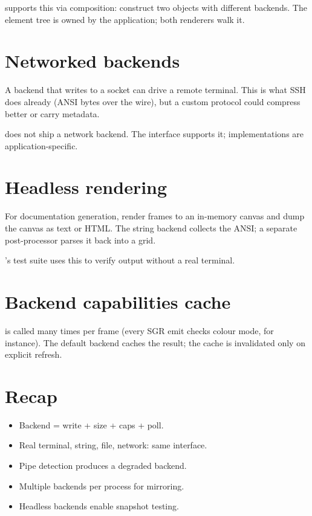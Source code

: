 \maya{} supports this via composition: construct two
 objects with different backends. The element
tree is owned by the application; both renderers walk it.

\section{Networked backends}

A backend that writes to a socket can drive a remote
terminal. This is what SSH does already (ANSI bytes over the
wire), but a custom protocol could compress better or carry
metadata.

\maya{} does not ship a network backend. The interface
supports it; implementations are application-specific.

\section{Headless rendering}

For documentation generation, render frames to an in-memory
canvas and dump the canvas as text or HTML. The string
backend collects the ANSI; a separate post-processor parses
it back into a grid.

\maya{}'s test suite uses this to verify output without a
real terminal.

\section{Backend capabilities cache}

 is called many times per frame (every SGR
emit checks colour mode, for instance). The default backend
caches the result; the cache is invalidated only on
explicit refresh.

\section{Recap}

\begin{recap}
\begin{itemize}[leftmargin=*]
  \item Backend = write + size + caps + poll.
  \item Real terminal, string, file, network: same interface.
  \item Pipe detection produces a degraded backend.
  \item Multiple backends per process for mirroring.
  \item Headless backends enable snapshot testing.
\end{itemize}
\end{recap}

